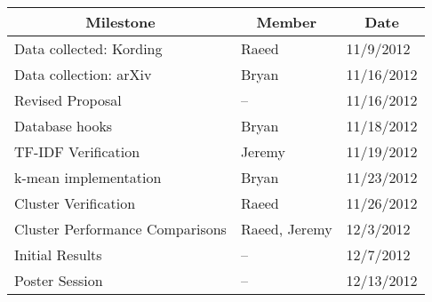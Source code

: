 \documentclass{acm_proc_article-sp}
\begin{document}
\begin{tabular}{|l|l|l|}
	\hline
	\multicolumn{1}{|c}{Milestone} & \multicolumn{1}{|c}{Member} & \multicolumn{1}{|c|}{Date}\\
	\hline \hline
	Data collected: Kording & Raeed & 11/9/2012 \\
	\hline
	Data collection: arXiv & Bryan & 11/16/2012 \\
	\hline
	Revised Proposal & -- & 11/16/2012 \\
	\hline
	Database hooks & Bryan & 11/18/2012\\
	\hline
	TF-IDF Verification & Jeremy & 11/19/2012\\
	\hline
	k-mean implementation & Bryan & 11/23/2012\\
	\hline
	Cluster Verification & Raeed & 11/26/2012\\
	\hline
	Cluster Performance Comparisons & Raeed, Jeremy & 12/3/2012\\
	\hline
	Initial Results & -- & 12/7/2012\\
	\hline
	Poster Session & -- & 12/13/2012\\
	\hline
\end{tabular}
%

\nocite{*}
\end{document}
